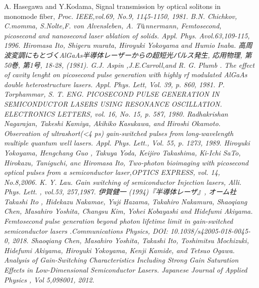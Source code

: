 \begin{thebibliography}{99}
 A. Hasegawa and Y.Kodama, Signal transmission by optical solitons in monomode fiber, \sl Proc. IEEE\rm ,vol.69, No.9, 1145-1150, 1981.
 B.N. Chichkov, C.momma, S.Nolte,F. von Alvensleben, A. T$\rm{\ddot{u}}$nnermann, Femtosecond, picosecond and nanosecond laser ablation of solids. \sl Appl. Phys. A\rm vol.63,109-115, 1996.
 Hiromasa Ito, Shigeru 
murata, Hiroyuki Yokoyama and Humio Inaba. 高周波変調にもとづくAlGaAs半導体レーザーからの超短光パルス発生, 応用物理, 第50巻, 第1号, 18-28, (1981).
 G.J. Aspin ,J.E.Carroll,and R. G. Plumb . The effect of cavity lenght on picosecond pulse generation with highly rf modulated AlGaAs double heterostructure lasers. \sl Appl. Phys. Lett\rm , Vol. 39, p. 860, 1981.
 P. Torphammar, S. T. ENG. PICOSECOND PULSE GENERATION IN SEMICONDUCTOR LASERS USING RESONANCE OSCILLATION. \sl ELECTRONICS LETTERS\rm , vol. 16, No. 15, p. 587, 1980.
 Radhakrishan Nagarajan, Takeshi Kamiya, Akihiko Kasukawa, and Hiroshi Okamoto. Observation of ultrashort(<4 ps) gain-switched pulses from long-wavelength multiple quantum well lasers. \sl Appl. Phys. Lett.\rm , Vol. 55, p. 1273, 1989.
 Hiroyuki Yokoyama, Hengchang Guo , Takuya Yoda, Keijiro Takashima, Ki-Ichi SaTo, Hirokazu, Taniguchi, anc Hiromasa Ito, Two-photon bioimaging with picosecond optical pulses from a semiconductor laser,\sl OPTICS EXPRESS\rm , vol. 14, No.8,2006.
 K. Y. Lau. Gain switching of semiconductor Injection lasers, \sl Alli. Phys. Lett. \rm , vol.53, 257,1987.
 伊賀健一 (1994)『半導体レーザ』, オーム社
Takashi Ito
, Hidekazu Nakamae, Yuji Hazama, Takahiro Nakamura, Shaoqiang Chen, Masahiro Yoshita, Changsu Kim, Yohei Kobayashi and Hidefumi Akiyama.
Femtosecond pulse generation beyond photon lifetime limit in gain-switched semiconductor lasers .\sl Communications Physics\rm , DOI: 10.1038/s42005-018-0045-0, 2018. 
 Shaoqiang Chen, Masahiro Yoshita, Takashi Ito, Toshimitsu Mochizuki, Hidefumi Akiyama, Hiroyuki Yokoyama, Kenji Kamide, and Tetsuo Ogawa. Analysis of Gain-Switching Characteristics Including Strong Gain Saturation Effects in Low-Dimensional Semiconductor Lasers. \sl Japanese Journal of Applied  Physics \rm , Vol 5,098001, 2012.


\end{thebibliography}
